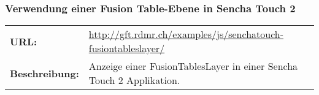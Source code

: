 \subsubsection{Verwendung einer Fusion Table-Ebene in Sencha Touch 2}
\begin{table}[H]
\centering
\begin{tabular}{p{0.2\twocelltabwidth}p{0.8\twocelltabwidth}}
\textbf{URL:} & \url{http://gft.rdmr.ch/examples/js/senchatouch-fusiontableslayer/} \\ 
\textbf{Beschreibung:} & Anzeige einer FusionTablesLayer in einer Sencha Touch 2 Applikation. \\ 
\end{tabular} 
\end{table}